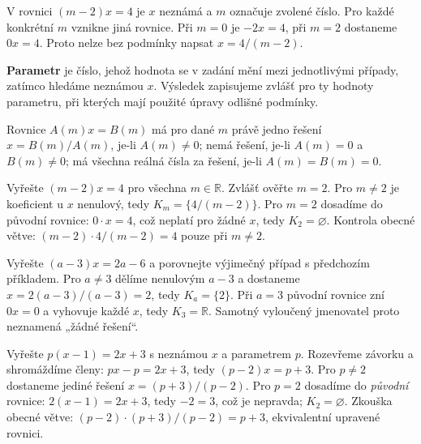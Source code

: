 \documentclass[11pt,a4paper]{article}
\begin{document}
V rovnici $(m-2)x=4$ je $x$ neznámá a $m$ označuje zvolené číslo. Pro každé konkrétní $m$ vznikne jiná rovnice. Při $m=0$ je $-2x=4$, při $m=2$ dostaneme $0x=4$. Proto nelze bez podmínky napsat $x=4/(m-2)$.
\begin{definiceBox}
\textbf{Parametr} je číslo, jehož hodnota se v zadání mění mezi jednotlivými případy, zatímco hledáme neznámou $x$. Výsledek zapisujeme zvlášť pro ty hodnoty parametru, při kterých mají použité úpravy odlišné podmínky.
\end{definiceBox}
\begin{definiceBox}
Rovnice $A(m)x=B(m)$ má pro dané $m$ právě jedno řešení $x=B(m)/A(m)$, je-li $A(m)\ne0$; nemá řešení, je-li $A(m)=0$ a $B(m)\ne0$; má všechna reálná čísla za řešení, je-li $A(m)=B(m)=0$.
\end{definiceBox}
\begin{prikladReseniBox}
Vyřešte $(m-2)x=4$ pro všechna $m\in\mathbb R$. Zvlášť ověřte $m=2$.
\tcblower
Pro $m\ne2$ je koeficient u $x$ nenulový, tedy $K_m=\{4/(m-2)\}$. Pro $m=2$ dosadíme do původní rovnice: $0\cdot x=4$, což neplatí pro žádné $x$, tedy $K_2=\varnothing$. Kontrola obecné větve: $(m-2)\cdot4/(m-2)=4$ pouze při $m\ne2$.
\end{prikladReseniBox}
\begin{prikladReseniBox}
Vyřešte $(a-3)x=2a-6$ a porovnejte výjimečný případ s předchozím příkladem.
\tcblower
Pro $a\ne3$ dělíme nenulovým $a-3$ a dostaneme $x=2(a-3)/(a-3)=2$, tedy $K_a=\{2\}$. Při $a=3$ původní rovnice zní $0x=0$ a vyhovuje každé $x$, tedy $K_3=\mathbb R$. Samotný vyloučený jmenovatel proto neznamená „žádné řešení“.
\end{prikladReseniBox}
\begin{prikladReseniBox}
Vyřešte $p(x-1)=2x+3$ s neznámou $x$ a parametrem $p$.
\tcblower
Rozevřeme závorku a shromáždíme členy: $px-p=2x+3$, tedy $(p-2)x=p+3$. Pro $p\ne2$ dostaneme jediné řešení $x=(p+3)/(p-2)$. Pro $p=2$ dosadíme do \emph{původní} rovnice: $2(x-1)=2x+3$, tedy $-2=3$, což je nepravda; $K_2=\varnothing$. Zkouška obecné větve: $(p-2)\cdot(p+3)/(p-2)=p+3$, ekvivalentní upravené rovnici.
\end{prikladReseniBox}
\newpage
{}
\end{document}

